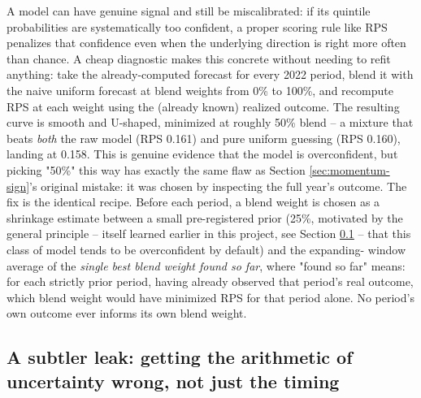 \documentclass[11pt]{article}
\begin{document}
A model can have genuine signal and still be miscalibrated: if its quintile
probabilities are systematically too confident, a proper scoring rule like RPS
penalizes that confidence even when the underlying direction is right more
often than chance. A cheap diagnostic makes this concrete without needing to
refit anything: take the already-computed forecast for every 2022 period,
blend it with the naive uniform forecast at blend weights from 0\% to 100\%,
and recompute RPS at each weight using the (already known) realized outcome.
The resulting curve is smooth and U-shaped, minimized at roughly 50\% blend --
a mixture that beats \emph{both} the raw model (RPS 0.161) and pure uniform
guessing (RPS 0.160), landing at 0.158. This is genuine evidence that the
model is overconfident, but picking "50\%" this way has exactly the same flaw
as Section \ref{sec:momentum-sign}'s original mistake: it was chosen by
inspecting the full year's outcome. The fix is the identical recipe. Before
each period, a blend weight is chosen as a shrinkage estimate between a small
pre-registered prior (25\%, motivated by the general principle -- itself
learned earlier in this project, see Section \ref{sec:residual-noise} -- that
this class of model tends to be overconfident by default) and the expanding-
window average of the \emph{single best blend weight found so far}, where
"found so far" means: for each strictly prior period, having already observed
that period's real outcome, which blend weight would have minimized RPS for
that period alone. No period's own outcome ever informs its own blend
weight.

\subsection{A subtler leak: getting the arithmetic of uncertainty wrong, not just the timing}
\label{sec:residual-noise}
\end{document}
